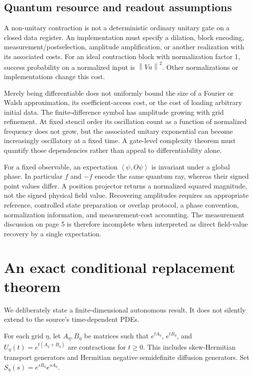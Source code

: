 \documentclass[11pt]{article}
\newcommand{\norm}[1]{\left\lVert #1\right\rVert}
\newcommand{\ip}[2]{\left\langle #1,#2\right\rangle}
\begin{document}
\subsection{Quantum resource and readout assumptions}
A non-unitary contraction is not a deterministic ordinary unitary gate
on a closed data register. An implementation must specify a dilation,
block encoding, measurement/postselection, amplitude amplification, or
another realization with its associated costs.
For an ideal contraction block with normalization factor 1, success
probability on a normalized input is $\norm{Vu}^2$.
Other normalizations or implementations change this cost.

Merely being differentiable does not uniformly bound the size of a
Fourier or Walsh approximation, its coefficient-access cost, or the
cost of loading arbitrary initial data. The finite-difference symbol
has amplitude growing with grid refinement. At fixed stencil order its
oscillation count as a function of normalized frequency does not grow,
but the associated unitary exponential can become increasingly
oscillatory at a fixed time. A gate-level complexity theorem must
quantify those dependencies rather than appeal to differentiability
alone.

For a fixed observable, an expectation $\ip{\psi}{O\psi}$ is invariant
under a global phase. In particular $f$ and $-f$ encode the same quantum
ray, whereas their signed point values differ. A position projector
returns a normalized squared magnitude, not the signed physical
field value. Recovering amplitudes requires an appropriate reference,
controlled state preparation or overlap protocol, a phase convention,
normalization information, and measurement-cost accounting.
The measurement discussion on page 5 is therefore incomplete when
interpreted as direct field-value recovery by a single expectation.

\section{An exact conditional replacement theorem}
We deliberately state a finite-dimensional autonomous result. It does
not silently extend to the source's time-dependent PDEs.

For each grid $\eta$, let $A_\eta,B_\eta$ be matrices such that
$e^{tA_\eta}$, $e^{tB_\eta}$, and
$U_\eta(t)=e^{t(A_\eta+B_\eta)}$ are contractions for $t\geq0$.
This includes skew-Hermitian transport generators and Hermitian
negative semidefinite diffusion generators. Set
$S_\eta(s)=e^{sB_\eta}e^{sA_\eta}$.
\end{document}
